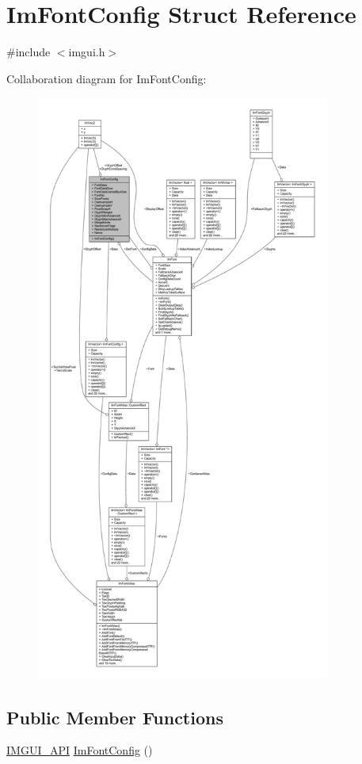 \hypertarget{struct_im_font_config}{}\section{Im\+Font\+Config Struct Reference}
\label{struct_im_font_config}


{\ttfamily \#include $<$imgui.\+h$>$}



Collaboration diagram for Im\+Font\+Config\+:
\nopagebreak
\begin{figure}[H]
\begin{center}
\leavevmode
\includegraphics[height=550pt]{struct_im_font_config__coll__graph}
\end{center}
\end{figure}
\subsection*{Public Member Functions}
\begin{DoxyCompactItemize}
\item 
\mbox{\hyperlink{imgui_8h_a43829975e84e45d1149597467a14bbf5}{I\+M\+G\+U\+I\+\_\+\+A\+PI}} \mbox{\hyperlink{struct_im_font_config_af56ce39ce94ce0fb5171f4d8aa93f79c}{Im\+Font\+Config}} ()
\end{DoxyCompactItemize}
